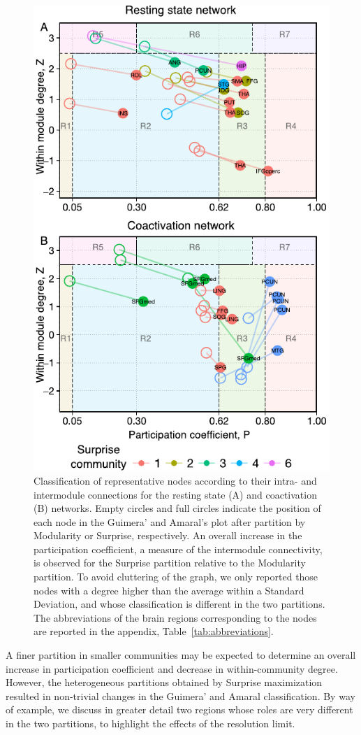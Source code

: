\begin{figure}[ht!]
\centering
\includegraphics[width=0.5\linewidth]{images/figure_6_ga_rs_coact.pdf}
\caption{Classification of representative nodes according to their intra- and intermodule connections for the resting state (A) and coactivation (B) networks. Empty circles and full circles indicate the position of each node in the Guimera' and Amaral’s plot after partition by Modularity or Surprise, respectively. An overall increase in the participation coefficient, a measure of the intermodule connectivity, is observed for the Surprise partition relative to the Modularity partition. To avoid cluttering of the graph, we only reported those nodes with a degree higher than the average within a Standard Deviation, and whose classification is different in the two partitions. The abbreviations of the brain regions corresponding to the nodes are reported in the appendix, Table~\ref{tab:abbreviations}.}
\label{fig:figure_6_ga_rs_coact}
\end{figure}

A finer partition in smaller communities may be expected to determine an overall increase in participation coefficient and decrease in within-community degree. However, the heterogeneous partitions obtained by Surprise maximization resulted in non-trivial changes in the Guimera' and Amaral classification. By way of example, we discuss in greater detail two regions whose roles are very different in the two partitions, to highlight the effects of the resolution limit.

